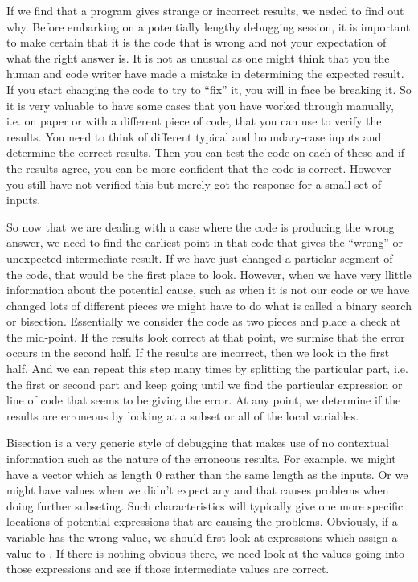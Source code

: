 If we find that a program gives strange or incorrect results, we neded
to find out why. Before embarking on a potentially lengthy debugging
session, it is important to make certain that it is the code that is
wrong and not your expectation of what the right answer is. It is not
as unusual as one might think that you the human and code writer have
made a mistake in determining the expected result.  If you start
changing the code to try to ``fix'' it, you will in face be breaking
it.  So it is very valuable to have some cases that you have worked
through manually, i.e.  on paper or with a different piece of code,
that you can use to verify the results. You need to think of different
typical and boundary-case inputs and determine the correct results.
Then you can test the code on each of these and if the results agree,
you can be more confident that the code is correct.  However you still
have not verified this but merely got the response for a small set of
inputs.

So now that we are dealing with a case where the code is producing the
wrong answer, we need to find the earliest point in that code that
gives the ``wrong'' or unexpected intermediate result.  If we have
just changed a particlar segment of the code, that would be the first
place to look. However, when we have very llittle information about
the potential cause, such as when it is not our code or we have
changed lots of different pieces we might have to do what is called a
binary search or bisection.  Essentially we consider the code as two
pieces and place a check at the mid-point. If the results look correct
at that point, we surmise that the error occurs in the second half.
If the results are incorrect, then we look in the first half. And we
can repeat this step many times by splitting the particular part,
i.e. the first or second part and keep going until we find the
particular expression or line of code that seems to be giving the
error.  At any point, we determine if the results are erroneous by
looking at a subset or all of the local variables.

Bisection is a very generic style of debugging that makes use of no
contextual information such as the nature of the erroneous results.
For example, we might have a vector which as length $0$ rather than
the same length as the inputs. Or we might have \NA{} values when we
didn't expect any and that causes problems when doing further
subseting.  Such characteristics will typically give one more specific
locations of potential expressions that are causing the problems.
Obviously, if a variable  has the wrong value, we should first
look at expressions which assign a value to . If there is
nothing obvious there, we need look at the values going into those
expressions and see if those intermediate values are correct.

